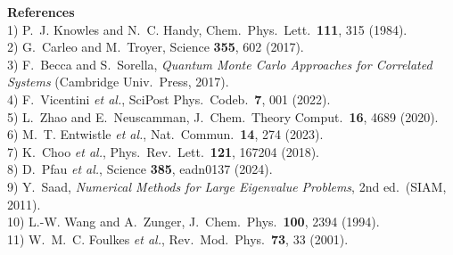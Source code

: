 \documentclass[10pt,a4paper]{article}
\begin{document}
\vspace{4pt}
{\small\noindent\textbf{References}\\[2pt]
1) P.~J. Knowles and N.~C. Handy, Chem.\ Phys.\ Lett.\ \textbf{111}, 315 (1984).\\
2) G.~Carleo and M.~Troyer, Science \textbf{355}, 602 (2017).\\
3) F.~Becca and S.~Sorella, \emph{Quantum Monte Carlo Approaches for Correlated Systems} (Cambridge Univ.\ Press, 2017).\\
4) F.~Vicentini \emph{et al.}, SciPost Phys.\ Codeb.\ \textbf{7}, 001 (2022).\\
5) L.~Zhao and E.~Neuscamman, J.\ Chem.\ Theory Comput.\ \textbf{16}, 4689 (2020).\\
6) M.~T. Entwistle \emph{et al.}, Nat.\ Commun.\ \textbf{14}, 274 (2023).\\
7) K.~Choo \emph{et al.}, Phys.\ Rev.\ Lett.\ \textbf{121}, 167204 (2018).\\
8) D.~Pfau \emph{et al.}, Science \textbf{385}, eadn0137 (2024).\\
9) Y.~Saad, \emph{Numerical Methods for Large Eigenvalue Problems}, 2nd ed.\ (SIAM, 2011).\\
10) L.-W. Wang and A.~Zunger, J.\ Chem.\ Phys.\ \textbf{100}, 2394 (1994).\\
11) W.~M.~C. Foulkes \emph{et al.}, Rev.\ Mod.\ Phys.\ \textbf{73}, 33 (2001).
}
\end{document}
